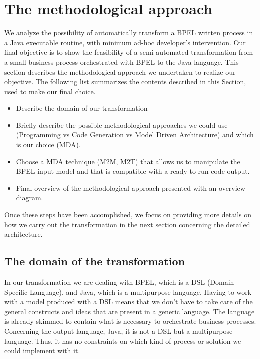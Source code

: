 \section{The methodological approach}
\label{MethodApproach}

We analyze the possibility of automatically transform a BPEL written process in a Java executable routine, with minimum ad-hoc developer’s intervention. Our final objective is to show the feasibility of a semi-automated transformation from a small business process orchestrated with BPEL to the Java language.
This section describes the methodological approach we undertaken to realize our objective. The following list summarizes the contents described in this Section, used to make our final choice.%

\begin{itemize}
 \item Describe the domain of our transformation
 \item Briefly describe the possible methodological approaches we could use (Programming vs Code Generation vs Model Driven Architecture) and which is our choice (MDA). 
 \item Choose a MDA technique (M2M, M2T) that allows us to manipulate the BPEL input model and that is compatible with a ready to run code output.
 \item Final overview of the methodological approach presented with an overview diagram.
\end{itemize}  

Once these steps have been accomplished, we focus on providing more details on how we carry out the transformation in the next section concerning the detailed architecture.


\subsection{The domain of the transformation} 
\label{sec:TransfDomain}
In our transformation we are dealing with BPEL, which is a DSL (Domain Specific Language), and Java, which is a multipurpose language. 
Having to work with a model produced with a DSL means that we don't have to take care of the general constructs and ideas that are present in a generic language. The language is already skimmed to contain what is necessary to orchestrate business processes.
Concerning the output language, Java, it is not a DSL but a multipurpose language. Thus, it has no constraints on which kind of process or solution we could implement with it. %
 

